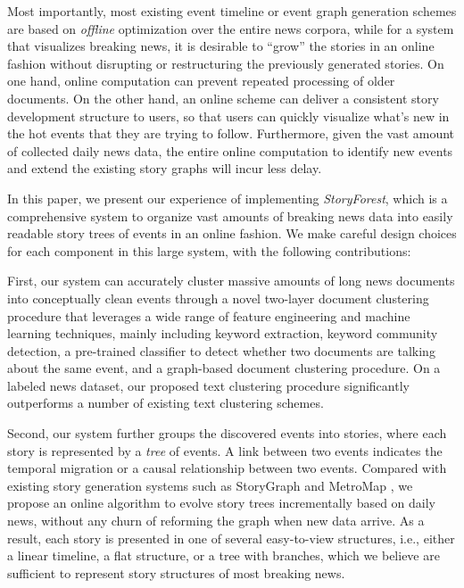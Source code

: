 Most importantly, most existing event timeline or event graph generation schemes are based on \emph{offline} optimization over the entire news corpora, while for a system that visualizes breaking news, it is desirable to ``grow'' the stories in an online fashion without disrupting or restructuring the previously generated stories. On one hand, online computation can prevent repeated processing of older documents. On the other hand, an online scheme can deliver a consistent story development structure to users, so that users can quickly visualize what's new in the hot events that they are trying to follow. Furthermore, given the vast amount of collected daily news data, the entire online computation to identify new events and extend the existing story graphs will incur less delay. 



In this paper, we present our experience of implementing \textit{StoryForest}, which is a comprehensive system to organize vast amounts of breaking news data into easily readable story trees of events in an online fashion.
We make careful design choices for each component in this large system, with the following contributions:

First, our system can accurately cluster massive amounts of long news documents into conceptually clean events through a novel two-layer document clustering procedure that leverages a wide range of feature engineering and machine learning techniques, mainly including keyword extraction, keyword community detection, a pre-trained classifier to detect whether two documents are talking about the same event, and a graph-based document clustering procedure. On a labeled news dataset, our proposed text clustering procedure significantly outperforms a number of existing text clustering schemes.

Second, our system further groups the discovered events into stories, where each story is represented by a \emph{tree} of events. A link between two events indicates the temporal migration or a causal relationship between two events. Compared with existing story generation systems such as StoryGraph \cite{yang2009discovering} and MetroMap \cite{shahaf2012trains}, we propose an online algorithm to evolve story trees incrementally based on daily news, without any churn of reforming the graph when new data arrive.
As a result, each story is presented in one of several easy-to-view structures, i.e., either a linear timeline, a flat structure, or a tree with branches, which we believe are sufficient to represent story structures of most breaking news. 

